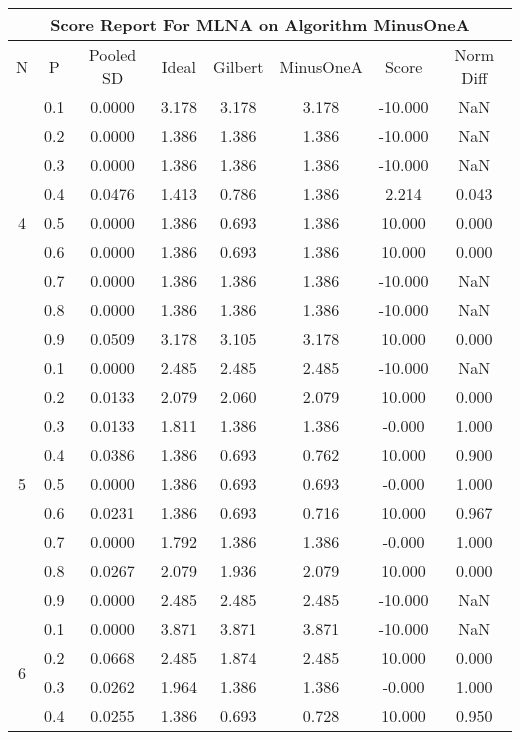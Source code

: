 \documentclass[11pt,a4paper]{report}
\begin{document}
\begin{longtable}{ | c | c || c | c | c | c | c | c | }
\hline
\multicolumn{8}{|c|}{ Score Report For MLNA on Algorithm MinusOneA} \\
\hline
N & P & Pooled SD &  Ideal &  Gilbert & MinusOneA  & Score & Norm Diff \\
 \hline
 \hline
 \endhead
\multirow{9}{*}{4} & 0.1 & 0.0000 & 3.178 & 3.178 & 3.178 & -10.000 & NaN \\
 & 0.2 & 0.0000 & 1.386 & 1.386 & 1.386 & -10.000 & NaN \\
 & 0.3 & 0.0000 & 1.386 & 1.386 & 1.386 & -10.000 & NaN \\
 & 0.4 & 0.0476 & 1.413 & 0.786 & 1.386 & 2.214 & 0.043 \\
 & 0.5 & 0.0000 & 1.386 & 0.693 & 1.386 & 10.000 & 0.000 \\
 & 0.6 & 0.0000 & 1.386 & 0.693 & 1.386 & 10.000 & 0.000 \\
 & 0.7 & 0.0000 & 1.386 & 1.386 & 1.386 & -10.000 & NaN \\
 & 0.8 & 0.0000 & 1.386 & 1.386 & 1.386 & -10.000 & NaN \\
 & 0.9 & 0.0509 & 3.178 & 3.105 & 3.178 & 10.000 & 0.000 \\
 \hline
\multirow{9}{*}{5} & 0.1 & 0.0000 & 2.485 & 2.485 & 2.485 & -10.000 & NaN \\
 & 0.2 & 0.0133 & 2.079 & 2.060 & 2.079 & 10.000 & 0.000 \\
 & 0.3 & 0.0133 & 1.811 & 1.386 & 1.386 & -0.000 & 1.000 \\
 & 0.4 & 0.0386 & 1.386 & 0.693 & 0.762 & 10.000 & 0.900 \\
 & 0.5 & 0.0000 & 1.386 & 0.693 & 0.693 & -0.000 & 1.000 \\
 & 0.6 & 0.0231 & 1.386 & 0.693 & 0.716 & 10.000 & 0.967 \\
 & 0.7 & 0.0000 & 1.792 & 1.386 & 1.386 & -0.000 & 1.000 \\
 & 0.8 & 0.0267 & 2.079 & 1.936 & 2.079 & 10.000 & 0.000 \\
 & 0.9 & 0.0000 & 2.485 & 2.485 & 2.485 & -10.000 & NaN \\
 \hline
\multirow{9}{*}{6} & 0.1 & 0.0000 & 3.871 & 3.871 & 3.871 & -10.000 & NaN \\
 & 0.2 & 0.0668 & 2.485 & 1.874 & 2.485 & 10.000 & 0.000 \\
 & 0.3 & 0.0262 & 1.964 & 1.386 & 1.386 & -0.000 & 1.000 \\
 & 0.4 & 0.0255 & 1.386 & 0.693 & 0.728 & 10.000 & 0.950 \\

\end{longtable}
\end{document}
